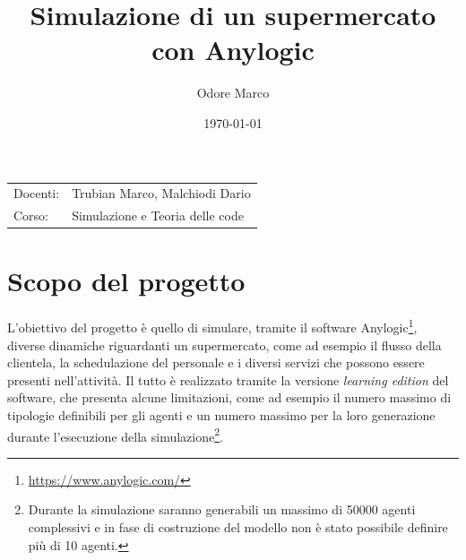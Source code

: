 \documentclass{article}
\title{Simulazione di un supermercato con Anylogic} %
\author{Odore Marco} %
\date{\today} %
\begin{document}
\maketitle %

\begin{center}
\begin{tabular}{l l}

Docenti: & Trubian Marco, Malchiodi Dario\\%
Corso: & Simulazione e Teoria delle code
\end{tabular}
\end{center}

\tableofcontents


\section{Scopo del progetto}

L'obiettivo del progetto è quello di simulare, tramite il software Anylogic\footnote{\url{https://www.anylogic.com/}}, diverse dinamiche riguardanti un supermercato, come ad esempio il flusso della clientela, la schedulazione del personale e i diversi servizi che possono essere presenti nell'attività. 
\newline
\newline
Il tutto è realizzato tramite la versione \emph{learning edition} del software, che presenta alcune limitazioni, come ad esempio il numero massimo di tipologie definibili per gli agenti e un numero massimo per la loro generazione durante l'esecuzione della simulazione\footnote{Durante la simulazione saranno generabili un massimo di 50000 agenti complessivi e in fase di costruzione del modello non è stato possibile definire più di 10 agenti.}.
\end{document}
